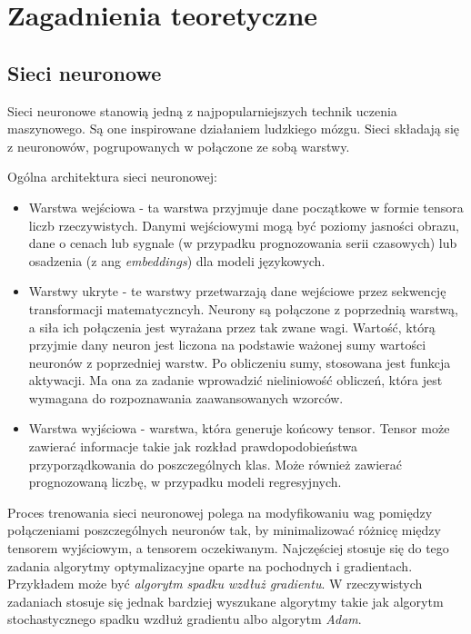 \chapter{Zagadnienia teoretyczne}


\section{Sieci neuronowe}

Sieci neuronowe stanowią jedną z najpopularniejszych technik uczenia maszynowego. Są one inspirowane działaniem ludzkiego mózgu. Sieci składają się z neuronowów, pogrupowanych w połączone ze sobą warstwy.

Ogólna architektura sieci neuronowej:
\begin{itemize}
    \item Warstwa wejściowa - ta warstwa przyjmuje dane początkowe w formie tensora liczb rzeczywistych. Danymi wejściowymi mogą być poziomy jasności obrazu, dane o cenach lub sygnale (w przypadku prognozowania serii czasowych) lub osadzenia (z ang \textit{embeddings}) dla modeli językowych.
    \item Warstwy ukryte - te warstwy przetwarzają dane wejściowe przez sekwencję transformacji matematyczncyh. Neurony są połączone z poprzednią warstwą, a siła ich połączenia jest wyrażana przez tak zwane wagi. Wartość, którą przyjmie dany neuron jest liczona na podstawie ważonej sumy wartości neuronów z poprzedniej warstw. Po obliczeniu sumy, stosowana jest funkcja aktywacji. Ma ona za zadanie wprowadzić nieliniowość obliczeń, która jest wymagana do rozpoznawania zaawansowanych wzorców.
    \item Warstwa wyjściowa - warstwa, która generuje końcowy tensor. Tensor może zawierać informacje takie jak rozkład prawdopodobieństwa przyporządkowania do poszczególnych klas. Może również zawierać prognozowaną liczbę, w przypadku modeli regresyjnych.
\end{itemize}

Proces trenowania sieci neuronowej polega na modyfikowaniu wag pomiędzy połączeniami poszczególnych neuronów tak, by minimalizować różnicę między tensorem wyjściowym, a tensorem oczekiwanym.
Najczęściej stosuje się do tego zadania algorytmy optymalizacyjne oparte na pochodnych i gradientach. Przykładem może być \textit{algorytm spadku wzdłuż gradientu}.
W rzeczywistych zadaniach stosuje się jednak bardziej wyszukane algorytmy takie jak algorytm stochastycznego spadku wzdłuż gradientu albo algorytm \textit{Adam}.

